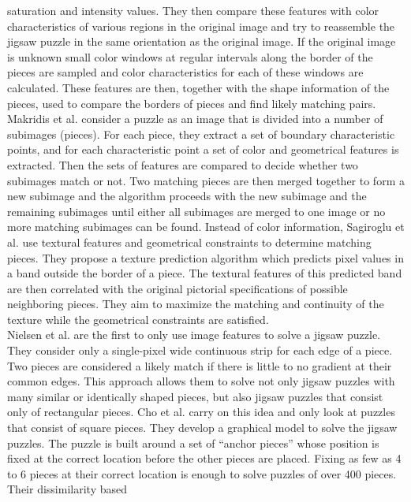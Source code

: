 \documentclass[11pt]{report}
\begin{document}
saturation and intensity values. They then compare these features with color
characteristics of various regions in the original image and try to reassemble
the jigsaw puzzle in the same orientation as the original image. If the
original image is unknown small color windows at regular intervals along the
border of the pieces are sampled and color characteristics for each of these
windows are calculated. These features are then, together with the shape
information of the pieces, used to compare the borders of pieces and find likely
matching pairs. Makridis et al. \cite{makridis2006new} consider a puzzle as an
image that is divided into a number of subimages (pieces). For each piece, they
extract a set of boundary characteristic points, and for each characteristic
point a set of color and geometrical features is extracted. Then the sets of
features are compared to decide whether two subimages match or not. Two matching
pieces are then merged together to form a new subimage and the algorithm
proceeds with the new subimage and the remaining subimages until either all
subimages are merged to one image or no more matching subimages can be found.
Instead of color information, Sagiroglu et al. \cite{sagiroglu2006texture} use
textural features and geometrical constraints to determine matching pieces. They
propose a texture prediction algorithm which predicts pixel values in a band
outside the border of a piece. The textural features of this predicted band are
then correlated with the original pictorial specifications of possible
neighboring pieces. They aim to maximize the matching and continuity of the
texture while the geometrical constraints are satisfied. \\
Nielsen et al. \cite{nielsen2008solving} are the first to only use image
features to solve a jigsaw puzzle. They consider only a single-pixel wide
continuous strip for each edge of a piece. Two pieces are considered a likely
match if there is little to no gradient at their common edges. This approach
allows them to solve not only jigsaw puzzles with many similar or identically shaped
pieces, but also jigsaw puzzles that consist only of rectangular pieces. Cho et
al. \cite{Cho2010} carry on this idea and only look at puzzles that consist of
square pieces. They develop a graphical model to solve the jigsaw puzzles. The
puzzle is built around a set of ``anchor pieces'' whose position is fixed at the
correct location before the other pieces are placed. Fixing
as few as 4 to 6 pieces at their correct location is enough to solve puzzles of
over 400 pieces. Their dissimilarity based
\end{document}
